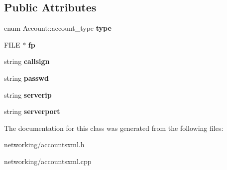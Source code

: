 \subsection*{Public Attributes}
\begin{DoxyCompactItemize}
\item 
enum Account\+::account\+\_\+type {\bfseries type}\hypertarget{classAccount_a58f7265a1c5cecaf34b188e980024553}{}\label{classAccount_a58f7265a1c5cecaf34b188e980024553}

\item 
F\+I\+LE $\ast$ {\bfseries fp}\hypertarget{classAccount_acd680cbae733b4b883de67ee13e4b465}{}\label{classAccount_acd680cbae733b4b883de67ee13e4b465}

\item 
string {\bfseries callsign}\hypertarget{classAccount_a00f21aacaca2fce3d18ee364cff58123}{}\label{classAccount_a00f21aacaca2fce3d18ee364cff58123}

\item 
string {\bfseries passwd}\hypertarget{classAccount_a1e6ade1b68755a397540b3239d47deb6}{}\label{classAccount_a1e6ade1b68755a397540b3239d47deb6}

\item 
string {\bfseries serverip}\hypertarget{classAccount_a3d72233d4c604857ac3c033fd8a39184}{}\label{classAccount_a3d72233d4c604857ac3c033fd8a39184}

\item 
string {\bfseries serverport}\hypertarget{classAccount_a46e91749eaff2c6d089559caf3452e2a}{}\label{classAccount_a46e91749eaff2c6d089559caf3452e2a}

\end{DoxyCompactItemize}


The documentation for this class was generated from the following files\+:\begin{DoxyCompactItemize}
\item 
networking/accountsxml.\+h\item 
networking/accountsxml.\+cpp\end{DoxyCompactItemize}
